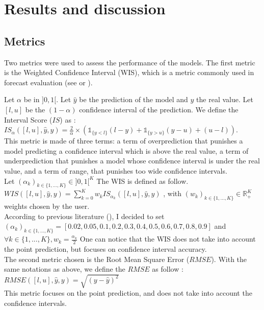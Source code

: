 \section{Results and discussion}


\subsection*{Metrics}
\label{sec:metrics}
Two metrics were used to assess the performance of the models. 
The first metric is the Weighted Confidence Interval (WIS), which is a metric commonly used in forecast evaluation (see \cite{cramer2022evaluation} or \cite{paireau2022ensemble}). 

Let $\alpha$ be in $]0, 1[$. Let $\hat{y}$ be the prediction of the model and $y$ the real value.
Let $[l, u]$ be the $(1-\alpha)$ confidence interval of the prediction.
We define the Interval Score ($IS$) as : \\
$IS_\alpha( [l, u], \hat{y}, y ) = \frac{2}{\alpha} \times ( \mathbb{1}_{\{y<l\}} (l-y) + \mathbb{1}_{\{y>u\}} (y-u) + (u-l))$. \\
This metric is made of three terms: a term of overprediction that punishes a model predicting a confidence interval which is above the real value, a term of underprediction that punishes a model whose confidence interval is under the real value, and a term of range, that punishes too wide confidence intervals. \\
Let $(\alpha_k)_{k \in \{1, \dots , K\}} \in ] 0 , 1 [ ^K $
The WIS is defined as follow. \\

$WIS( [l, u], \hat{y}, y ) = \sum_{k=0}^{K} w_k IS_{\alpha_k}( [l, u], \hat{y}, y ) $ , with $(w_k)_{k \in \{1, ... , K\}} \in \mathbb{R}_+ ^K $ weights chosen by the user. \\

According to previous literature (\cite{cramer2022evaluation}), I decided to set \\
$(\alpha_k)_{k \in \{1, ... , K\}} = [0.02, 0.05, 0.1, 0.2, 0.3, 0.4, 0.5, 0.6, 0.7, 0.8, 0.9]$ and $ \forall k \in  \{1, ... , K\}, w_k = \frac{\alpha_k}{2}$
One can notice that the WIS does not take into account the point prediction, but focuses on confidence interval accuracy. \\

The second metric chosen is the Root Mean Square Error ($RMSE$). 
With the same notations as above, we define the $RMSE$ as follow : \\
$RMSE([l, u], \hat{y}, y) = \sqrt{(y-\hat{y})^2}$\\
This metric focuses on the point prediction, and does not take into account the confidence intervals. 


